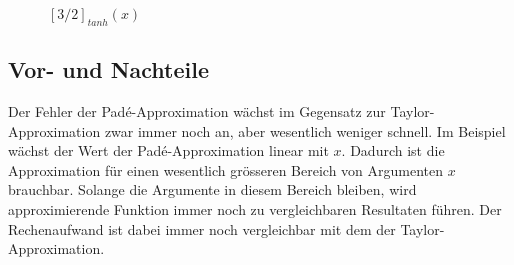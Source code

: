 \begin{figure}
\centering
{}
\caption{$[3 / 2]_{tanh}(x)$
\label{motivation:figure:Pade32}}
\end{figure}

\subsection{Vor- und Nachteile}
Der Fehler der Padé-Approximation wächst im Gegensatz zur
Taylor-Approximation zwar immer noch an, aber wesentlich weniger
schnell.
Im Beispiel wächst der Wert der Padé-Approximation linear mit $x$.
Dadurch ist die Approximation für einen wesentlich grösseren Bereich 
von Argumenten $x$ brauchbar.
Solange die Argumente in diesem Bereich bleiben, wird 
approximierende Funktion immer noch zu vergleichbaren Resultaten
führen.
Der Rechenaufwand ist dabei immer noch vergleichbar mit dem
der Taylor-Approximation.

